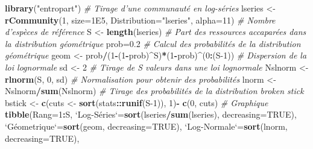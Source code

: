 \documentclass[
  11pt,
  french,
  a4paper,
  extrafontsizes,onecolumn,openright
  ]{memoir}
\newenvironment{Shaded}{\begin{snugshade}}{\end{snugshade}}
\newcommand{\CommentTok}[1]{\textcolor[rgb]{0.56,0.35,0.01}{\textit{#1}}}
\newcommand{\DataTypeTok}[1]{\textcolor[rgb]{0.13,0.29,0.53}{#1}}
\newcommand{\DecValTok}[1]{\textcolor[rgb]{0.00,0.00,0.81}{#1}}
\newcommand{\FloatTok}[1]{\textcolor[rgb]{0.00,0.00,0.81}{#1}}
\newcommand{\KeywordTok}[1]{\textcolor[rgb]{0.13,0.29,0.53}{\textbf{#1}}}
\newcommand{\NormalTok}[1]{#1}
\newcommand{\OperatorTok}[1]{\textcolor[rgb]{0.81,0.36,0.00}{\textbf{#1}}}
\newcommand{\OtherTok}[1]{\textcolor[rgb]{0.56,0.35,0.01}{#1}}
\newcommand{\StringTok}[1]{\textcolor[rgb]{0.31,0.60,0.02}{#1}}
\begin{document}
\begin{Shaded}
\begin{Highlighting}[]
\KeywordTok{library}\NormalTok{(}\StringTok{"entropart"}\NormalTok{)}
\CommentTok{# Tirage d'une communauté en log-séries}
\NormalTok{lseries <-}\StringTok{ }\KeywordTok{rCommunity}\NormalTok{(}\DecValTok{1}\NormalTok{, }\DataTypeTok{size=}\FloatTok{1E5}\NormalTok{, }\DataTypeTok{Distribution=}\StringTok{"lseries"}\NormalTok{, }\DataTypeTok{alpha=}\DecValTok{11}\NormalTok{)}
\CommentTok{# Nombre d'espèces de référence}
\NormalTok{S <-}\StringTok{ }\KeywordTok{length}\NormalTok{(lseries)}
\CommentTok{# Part des ressources accaparées dans la distribution géométrique}
\NormalTok{prob=}\FloatTok{0.2}
\CommentTok{# Calcul des probabilités de la distribution géométrique}
\NormalTok{geom <-}\StringTok{ }\NormalTok{prob}\OperatorTok{/}\NormalTok{(}\DecValTok{1}\OperatorTok{-}\NormalTok{(}\DecValTok{1}\OperatorTok{-}\NormalTok{prob)}\OperatorTok{^}\NormalTok{S)}\OperatorTok{*}\NormalTok{(}\DecValTok{1}\OperatorTok{-}\NormalTok{prob)}\OperatorTok{^}\NormalTok{(}\DecValTok{0}\OperatorTok{:}\NormalTok{(S}\DecValTok{-1}\NormalTok{))}
\CommentTok{# Dispersion de la loi lognormale}
\NormalTok{sd <-}\StringTok{ }\DecValTok{2}
\CommentTok{# Tirage de S valeurs dans une loi lognormale}
\NormalTok{Nslnorm <-}\StringTok{ }\KeywordTok{rlnorm}\NormalTok{(S, }\DecValTok{0}\NormalTok{, sd)}
\CommentTok{# Normalisation pour obtenir des probabilités}
\NormalTok{lnorm <-}\StringTok{ }\NormalTok{Nslnorm}\OperatorTok{/}\KeywordTok{sum}\NormalTok{(Nslnorm)}
\CommentTok{# Tirage des probabilités de la distribution broken stick}
\NormalTok{bstick <-}\StringTok{ }\KeywordTok{c}\NormalTok{(cuts <-}\StringTok{ }\KeywordTok{sort}\NormalTok{(stats}\OperatorTok{::}\KeywordTok{runif}\NormalTok{(S}\DecValTok{-1}\NormalTok{)), }\DecValTok{1}\NormalTok{)}\OperatorTok{-}\StringTok{ }\KeywordTok{c}\NormalTok{(}\DecValTok{0}\NormalTok{, cuts)}
\CommentTok{# Graphique}
\KeywordTok{tibble}\NormalTok{(}\DataTypeTok{Rang=}\DecValTok{1}\OperatorTok{:}\NormalTok{S,}
      \StringTok{`}\DataTypeTok{Log-Séries}\StringTok{`}\NormalTok{=}\KeywordTok{sort}\NormalTok{(lseries}\OperatorTok{/}\KeywordTok{sum}\NormalTok{(lseries), }\DataTypeTok{decreasing=}\OtherTok{TRUE}\NormalTok{),}
      \StringTok{`}\DataTypeTok{Géometrique}\StringTok{`}\NormalTok{=}\KeywordTok{sort}\NormalTok{(geom, }\DataTypeTok{decreasing=}\OtherTok{TRUE}\NormalTok{),}
      \StringTok{`}\DataTypeTok{Log-Normale}\StringTok{`}\NormalTok{=}\KeywordTok{sort}\NormalTok{(lnorm, }\DataTypeTok{decreasing=}\OtherTok{TRUE}\NormalTok{),}

\end{Highlighting}
\end{Shaded}
\end{document}
